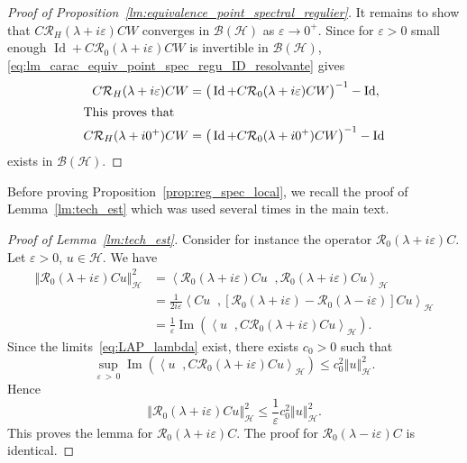 \documentclass[AHL,Unicode,longabstracts,published]{cedram}
\newcommand{\Hi}{\mathcal{H}}
\newcommand{\norme}[1]{\left\Vert #1\right\Vert}
\newcommand{\scal}[2]{\left\langle{#1} \middle., {#2}\right\rangle}
\newcommand{\Res}{\mathcal{R}}
\newcommand{\clB}{\mathcal{B}}
\DeclareMathOperator{\Id}{Id}
\DeclareMathOperator{\im}{Im}
\newcommand{\Hi}{\mathcal{H}}
\DeclareMathOperator{\im}{Im}
\begin{document}
\begin{proof}[Proof of Proposition~\ref{lm:equivalence_point_spectral_regulier}]
It remains to show that $C\Res_H(\lambda+ i\varepsilon)CW$ converges in $\clB(\Hi)$ as $\varepsilon\to0^+$. Since for $\varepsilon>0$ small enough $\Id+C\Res_0(\lambda+ i\varepsilon)CW$ is invertible in $\clB(\Hi)$, \eqref{eq:lm_carac_equiv_point_spec_regu_ID_resolvante} gives
\begin{align*}
C\Res_H(\lambda+ i\varepsilon)CW &=\big(\Id+C\Res_0(\lambda+ i\varepsilon)CW\big)^{-1}-\Id,
\\
\intertext{This proves that}
C\Res_H(\lambda+ i0^+)CW &=\big(\Id+C\Res_0(\lambda+ i0^+)CW\big)^{-1}-\Id
\end{align*}
exists in $\clB(\Hi)$.
\end{proof}

Before proving Proposition~\ref{prop:reg_spec_local}, we recall the proof of Lemma~\ref{lm:tech_est} which was used several times in the main text.

\begin{proof}[Proof of Lemma~\ref{lm:tech_est}]
Consider for instance the operator $\Res_0\left(\lambda+ i\varepsilon\right)C$. Let $\varepsilon>0$, $u\in\Hi$. We have
\begin{align*}
\norme{\Res_0\left(\lambda+i\varepsilon\right)Cu}_\Hi^2&=\scal{\Res_0\left(\lambda+i\varepsilon\right)Cu}{\Res_0\left(\lambda+i\varepsilon\right)Cu}_\Hi\\
&=\frac{1}{2i\varepsilon}\scal{Cu}{\left\lbrack\Res_0\left(\lambda+i\varepsilon\right)-\Res_0\left(\lambda-i\varepsilon\right)\right\rbrack Cu}_{\Hi}\\
&=\frac{1}{\varepsilon}\im\left(\scal{u}{C\Res_0\left(\lambda+i\varepsilon\right)Cu}_\Hi\right).
\end{align*}
Since the limits~\eqref{eq:LAP_lambda} exist, there exists $c_0>0$ such that
\begin{equation*}
\sup_{\varepsilon\,>\,0}\im\left(\scal{u}{C\Res_0\left(\lambda+i\varepsilon\right)Cu}_\Hi\right)\leq c_0^2\norme{u}_\Hi^2.
\end{equation*}
Hence
\begin{equation*}
\norme{\Res_0\left(\lambda+i\varepsilon\right)Cu}_\Hi^2\leq \frac{1}{\varepsilon}c_0^2\norme{u}_\Hi^2.
\end{equation*}
This proves the lemma for $\Res_0\left(\lambda+ i\varepsilon\right)C$. The proof for $\Res_0\left(\lambda- i\varepsilon\right)C$ is identical.
\end{proof}
\end{document}

